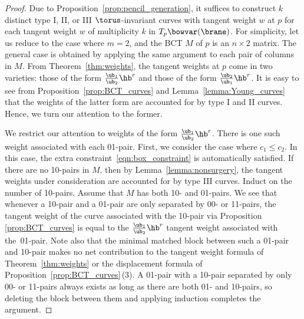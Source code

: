 \begin{proof}
Due to Proposition~\ref{prop:pencil_generation}, it suffices to construct $k$ distinct type I, II, or III $\torus$-invariant curves with tangent weight $w$ at $p$ for each tangent weight $w$ of multiplicity $k$ in $T_p\bowvar(\brane)$. For simplicity, let us reduce to the case where $m=2$, and the BCT $M$ of $p$ is an $n\times 2$ matrix. The general case is obtained by applying the same argument to each pair of columns in $M$.
From Theorem~\ref{thm:weights}, the tangent weights at $p$ come in two varieties: those of the form $\frac{\ub_1}{\ub_2}\hb^r$ and those of the form $\frac{\ub_2}{\ub_1}\hb^r$. It is easy to see from Proposition~\ref{prop:BCT_curves} and Lemma~\ref{lemma:Young_curves} that the weights of the latter form are accounted for by type I and II curves. Hence, we turn our attention to the former.

We restrict our attention to weights of the form $\frac{\ub_1}{\ub_2}\hb^r$. There is one such weight associated with each 01-pair. First, we consider the case where $c_1 \leq c_2$. In this case, the extra constraint~\eqref{eqn:box_constraint} is automatically satisfied. If there are no 10-pairs in $M$, then by Lemma~\ref{lemma:nonsurgery}, the tangent weights under consideration are accounted for by type III curves. Induct on the number of 10-pairs. Assume that $M$ has both 10- and 01-pairs. We see that whenever a 10-pair and a 01-pair are only separated by 00- or 11-pairs, the tangent weight of the curve associated with the 10-pair via Proposition \ref{prop:BCT_curves} is equal to the $\frac{\ub_1}{\ub_2}\hb^r$ tangent weight associated with the~01-pair. Note also that the minimal matched block between such a 01-pair and 10-pair makes no net contribution to the tangent weight formula of Theorem~\ref{thm:weights} or the displacement formula of Proposition~\ref{prop:BCT_curves}\,(3). A 01-pair with a 10-pair separated by only 00- or 11-pairs always exists as long as there are both 01- and 10-pairs, so deleting the block between them and applying induction completes the argument.


\end{proof}
